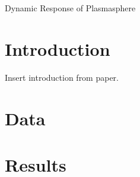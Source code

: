 Dynamic Response of Plasmasphere

\section{Introduction}

Insert introduction from paper.

\section{Data}

\section{Results}
